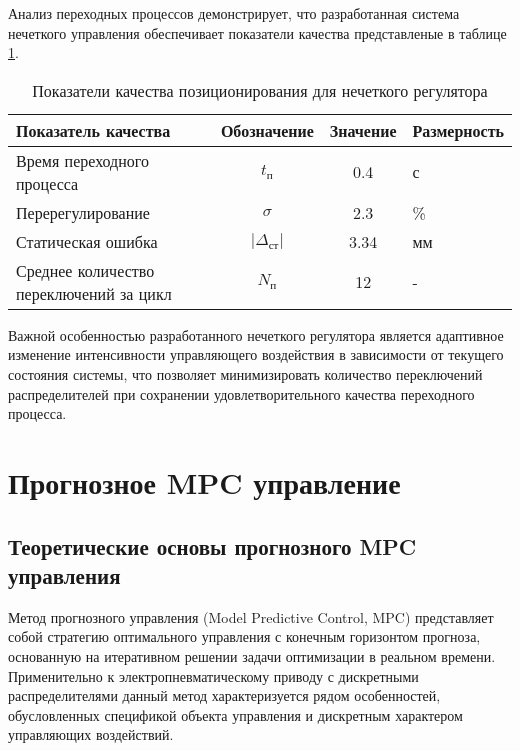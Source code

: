 Анализ переходных процессов демонстрирует, что разработанная система нечеткого управления обеспечивает показатели качества
представленые в таблице \ref{tab:fuzzy_quality}.

\begin{table}[h!]
	\centering
	\caption{Показатели качества позиционирования для нечеткого регулятора}
	\small
	\begin{tabular}{lccl}
		\textbf{Показатель качества}            & \textbf{Обозначение}   & \textbf{Значение} & \textbf{Размерность} \\
		\midrule
		Время переходного процесса              & $t_п$                  & \num{0.4}         & с                    \\
		Перерегулирование                       & $\sigma$               & \num{2.3}         & \%                   \\
		Статическая ошибка                      & $|\Delta_{\text{ст}}|$ & \num{3.34}        & мм                   \\
		Среднее количество переключений за цикл & $N_\text{п}$           & 12                & -                    \\
		\midrule
	\end{tabular}
	\label{tab:fuzzy_quality}
\end{table}


Важной особенностью разработанного нечеткого регулятора является адаптивное изменение интенсивности управляющего
воздействия в зависимости от текущего состояния системы, что позволяет минимизировать количество переключений распределителей при
сохранении удовлетворительного качества переходного процесса.

\section{Прогнозное MPC управление}\label{sec:ch3/sec5}

\subsection{Теоретические основы прогнозного MPC управления}\label{subsec:ch3/sec5/sub1}

Метод прогнозного управления (Model Predictive Control, MPC) представляет собой стратегию
оптимального управления с конечным горизонтом прогноза, основанную на итеративном решении задачи оптимизации в
реальном времени. Применительно к электропневматическому приводу с
дискретными распределителями данный метод характеризуется рядом особенностей, обусловленных
спецификой объекта управления и дискретным характером управляющих воздействий.

